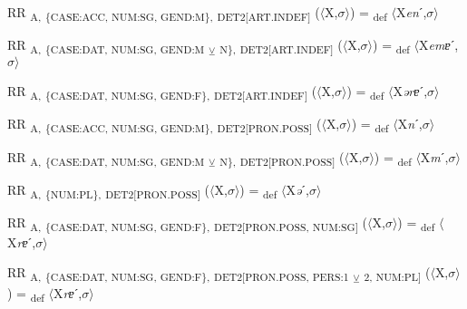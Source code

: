 {\begin{exe}
 RR \textsubscript{A,} \textsubscript{\{CASE:ACC, NUM:SG, GEND:M\},} \textsubscript{DET2[ART.INDEF]} ($\langle$X,$\sigma $$\rangle$) = \textsubscript{def} $\langle$X\textit{en}ˊ,$\sigma $$\rangle$
\end{exe}

\begin{exe}
 RR \textsubscript{A,} \textsubscript{\{CASE:DAT, NUM:SG, GEND:M} \textsubscript{${\veebar}$}\textsubscript{ N\},} \textsubscript{DET2[ART.INDEF]} ($\langle$X,$\sigma $$\rangle$) = \textsubscript{def} $\langle$X\textit{emɐ}ˊ,$\sigma $$\rangle$
\end{exe}

\begin{exe}
 RR \textsubscript{A,} \textsubscript{\{CASE:DAT, NUM:SG, GEND:F\},} \textsubscript{DET2[ART.INDEF]} ($\langle$X,$\sigma $$\rangle$) = \textsubscript{def} $\langle$X\textit{ərɐ}ˊ,$\sigma $$\rangle$
\end{exe}

\begin{exe}
 RR \textsubscript{A,} \textsubscript{\{CASE:ACC, NUM:SG, GEND:M\},} \textsubscript{DET2[PRON.POSS]} ($\langle$X,$\sigma $$\rangle$) = \textsubscript{def} $\langle$X\textit{n}ˊ,$\sigma $$\rangle$
\end{exe}

\begin{exe}
 RR \textsubscript{A,} \textsubscript{\{CASE:DAT, NUM:SG, GEND:M} \textsubscript{${\veebar}$}\textsubscript{ N\},} \textsubscript{DET2[PRON.POSS]} ($\langle$X,$\sigma $$\rangle$) = \textsubscript{def} $\langle$X\textit{m}ˊ,$\sigma $$\rangle$
\end{exe}

\begin{exe}
 RR \textsubscript{A,} \textsubscript{\{NUM:PL\},} \textsubscript{DET2[PRON.POSS]} ($\langle$X,$\sigma $$\rangle$) = \textsubscript{def} $\langle$X\textit{ə}ˊ,$\sigma $$\rangle$
\end{exe}

\begin{exe}
 RR \textsubscript{A,} \textsubscript{\{CASE:DAT, NUM:SG, GEND:F\},} \textsubscript{DET2[PRON.POSS, NUM:SG]} ($\langle$X,$\sigma $$\rangle$) = \textsubscript{def} $\langle$X\textit{rɐ}ˊ,$\sigma $$\rangle$
\end{exe}

\begin{exe}
 RR \textsubscript{A,} \textsubscript{\{CASE:DAT, NUM:SG, GEND:F\},} \textsubscript{DET2[PRON.POSS, PERS:1} \textsubscript{${\veebar}$}\textsubscript{ 2, NUM:PL]} ($\langle$X,$\sigma $$\rangle$) = \textsubscript{def} $\langle$X\textit{rɐ}ˊ,$\sigma $$\rangle$
\end{exe}

}

